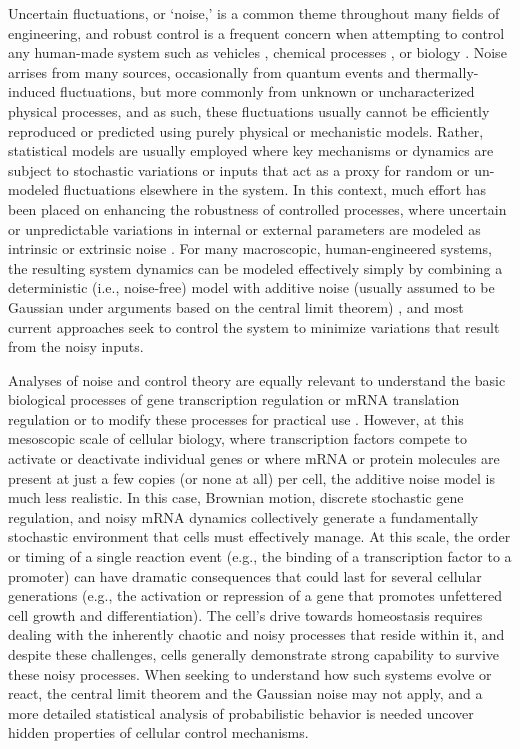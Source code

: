 \documentclass[12pt]{iopart}
\begin{document}
Uncertain fluctuations, or `noise,' is a common theme throughout many fields of engineering, and robust control is a frequent concern when attempting to control any human-made system such as vehicles \cite{Liang2021}, chemical processes \cite{Lucia2013}, or biology \cite{Baetica2020}.
Noise arrises from many sources, occasionally from quantum events and thermally-induced fluctuations, but more commonly from unknown or uncharacterized physical processes, and as such, these fluctuations usually cannot be efficiently reproduced or predicted using purely physical or mechanistic models.
Rather, statistical models are usually employed where key mechanisms or dynamics are subject to stochastic variations or inputs that act as a proxy for random or un-modeled fluctuations elsewhere in the system.
In this context, much effort has been placed on enhancing the robustness of controlled processes, where uncertain or unpredictable variations in internal or external parameters are modeled as intrinsic or extrinsic noise \cite{Bhattacharyya2017}.
For many macroscopic, human-engineered systems, the resulting system dynamics can be modeled effectively simply by combining a deterministic (i.e., noise-free) model with additive noise (usually assumed to be Gaussian under arguments based on the central limit theorem) \cite{Feng2022}, and most current approaches seek to control the system to minimize variations that result from the noisy inputs. 

Analyses of noise and control theory are equally relevant to understand the basic biological processes of gene transcription regulation \cite{Sun2020}or mRNA translation regulation \cite{Cialek2022}or to modify these processes for practical use \cite{Dionisi2022,Baumschlager2017}.
However, at this mesoscopic scale of cellular biology, where transcription factors compete to activate or deactivate individual genes or where mRNA or protein molecules are present at just a few copies (or none at all) per cell, the additive noise model is much less realistic.
In this case, Brownian motion, discrete stochastic gene regulation, and noisy mRNA dynamics collectively generate a fundamentally stochastic environment that cells must effectively manage. 
At this scale, the order or timing of a single reaction event (e.g., the binding of a transcription factor to a promoter) can have dramatic consequences that could last for several cellular generations (e.g., the activation or repression of a gene that promotes unfettered cell growth and differentiation). 
The cell's drive towards homeostasis requires dealing with the inherently chaotic and noisy processes that reside within it, and despite these challenges, cells generally demonstrate strong capability to survive these noisy processes. 
When seeking to understand how such systems evolve or react, the central limit theorem and the Gaussian noise may not apply, and a more detailed statistical analysis of probabilistic behavior is needed uncover hidden properties of cellular control mechanisms.
\end{document}

